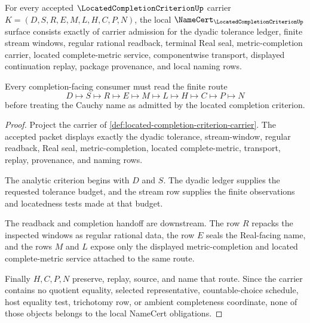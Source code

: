\begin{theorem}
\label{thm:located-completion-criterion-namecert-obligations}
For every accepted $\LocatedCompletionCriterionUp$ carrier $K=(D,S,R,E,M,L,H,C,P,N)$, the local $\NameCert_{\LocatedCompletionCriterionUp}$ surface consists exactly of carrier admission for the dyadic tolerance ledger, finite stream windows, regular rational readback, terminal Real seal, metric-completion carrier, located complete-metric service, componentwise transport, displayed continuation replay, package provenance, and local naming rows.

Every completion-facing consumer must read the finite route
$$
D\longmapsto S\longmapsto R\longmapsto E\longmapsto M\longmapsto L\longmapsto H\longmapsto C\longmapsto P\longmapsto N
$$
before treating the Cauchy name as admitted by the located completion criterion.
\end{theorem}
\begin{proof}
Project the carrier of \autoref{def:located-completion-criterion-carrier}. The accepted packet displays exactly the dyadic tolerance, stream-window, regular readback, Real seal, metric-completion, located complete-metric, transport, replay, provenance, and naming rows.

The analytic criterion begins with $D$ and $S$. The dyadic ledger supplies the requested tolerance budget, and the stream row supplies the finite observations and locatedness tests made at that budget.

The readback and completion handoff are downstream. The row $R$ repacks the inspected windows as regular rational data, the row $E$ seals the Real-facing name, and the rows $M$ and $L$ expose only the displayed metric-completion and located complete-metric service attached to the same route.

Finally $H,C,P,N$ preserve, replay, source, and name that route. Since the carrier contains no quotient equality, selected representative, countable-choice schedule, host equality test, trichotomy row, or ambient completeness coordinate, none of those objects belongs to the local NameCert obligations.
\end{proof}

